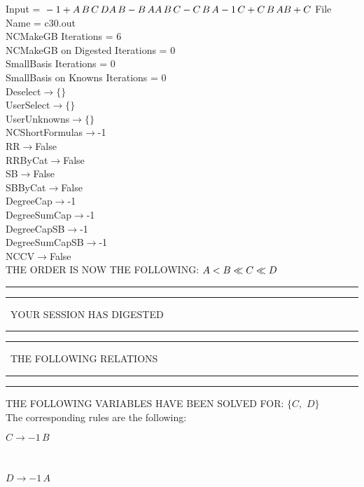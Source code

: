 \documentclass[rep10,leqno]{report}
\begin{document}
\normalsize
\baselineskip=12pt
\noindent
Input = 
$
\\-1 + A\,
 B\,
 C\,
 D\\
A\,
 B - B\,
 A\\
A\,
 B\,
 C - C\,
 B\,
 A\\
-1\,
 C + C\,
 B\,
 A\\
B + C\\
$
File Name = c30.out\\
NCMakeGB Iterations = 6\\
NCMakeGB on Digested Iterations = 0\\
SmallBasis Iterations = 0\\
SmallBasis on Knowns Iterations = 0\\
Deselect$\rightarrow \{\}$\\
UserSelect$\rightarrow \{\}$\\
UserUnknowns$\rightarrow \{\}$\\
NCShortFormulas$\rightarrow$-1\\
RR$\rightarrow $False\\
RRByCat$\rightarrow $False\\
SB$\rightarrow $False\\
SBByCat$\rightarrow $False\\
DegreeCap$\rightarrow $-1\\
DegreeSumCap$\rightarrow $-1\\
DegreeCapSB$\rightarrow $-1\\
DegreeSumCapSB$\rightarrow $-1\\
NCCV$\rightarrow $False\\
THE ORDER IS NOW THE FOLLOWING:\hfil\break
$
A<B\ll
C\ll
D\\
$
\rule[2pt]{6in}{4pt}\hfil\break
\rule[2pt]{1.879in}{4pt}
\ YOUR SESSION HAS DIGESTED\ 
\rule[2pt]{1.879in}{4pt}\hfil\break
\rule[2pt]{1.923in}{4pt}
\ THE FOLLOWING RELATIONS\ 
\rule[2pt]{1.923in}{4pt}\hfil\break
\rule[2pt]{6in}{4pt}\hfil\break
THE FOLLOWING VARIABLES HAVE BEEN SOLVED FOR:\hfil\break
$\{C,
$ $
D\}$
\smallskip\\
The corresponding rules are the following:\smallskip\\
\begin{minipage}{6in}
$
C\rightarrow -1\,
 B
$
\end{minipage}\medskip\\
\begin{minipage}{6in}
$
D\rightarrow -1\,
 A
$
\end{minipage}\medskip\\
\end{document}
